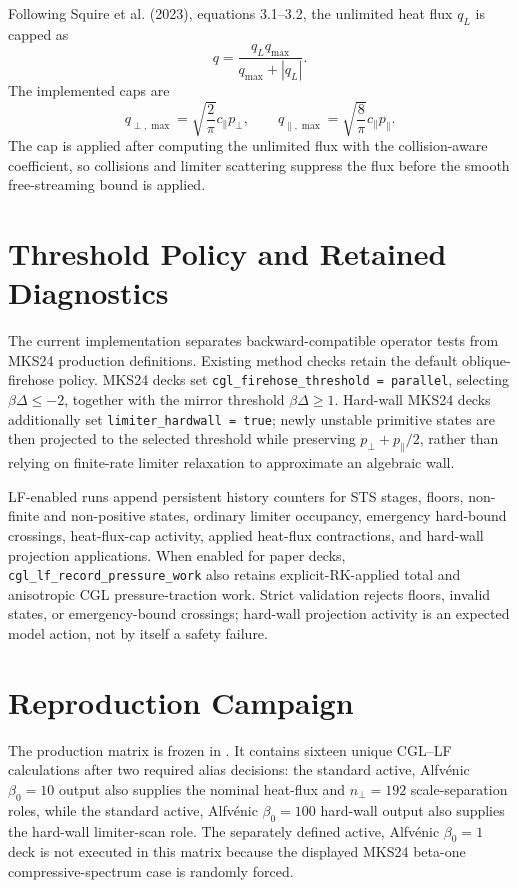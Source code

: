\documentclass[11pt]{article}
\begin{document}
Following Squire et al. (2023), equations 3.1--3.2, the unlimited heat flux
\(q_L\) is capped as
\begin{equation}
  q = \frac{q_L q_{\max}}{q_{\max} + |q_L|}.
\end{equation}
The implemented caps are
\begin{equation}
  q_{\perp,\max} = \sqrt{\frac{2}{\pi}} c_\parallel p_\perp,
  \qquad
  q_{\parallel,\max} = \sqrt{\frac{8}{\pi}} c_\parallel p_\parallel.
\end{equation}
The cap is applied after computing the unlimited flux with the collision-aware
coefficient, so collisions and limiter scattering suppress the flux before the
smooth free-streaming bound is applied.

\section{Threshold Policy and Retained Diagnostics}

The current implementation separates backward-compatible operator tests from
MKS24 production definitions.  Existing method checks retain the default
oblique-firehose policy.  MKS24 decks set
\texttt{cgl\_firehose\_threshold = parallel}, selecting
\(\beta\Delta \leq -2\), together with the mirror threshold
\(\beta\Delta \geq 1\).  Hard-wall MKS24 decks additionally set
\texttt{limiter\_hardwall = true}; newly unstable primitive states are then
projected to the selected threshold while preserving
\(p_\perp + p_\parallel/2\), rather than relying on finite-rate limiter
relaxation to approximate an algebraic wall.

LF-enabled runs append persistent history counters for STS stages, floors,
non-finite and non-positive states, ordinary limiter occupancy, emergency
hard-bound crossings, heat-flux-cap activity, applied heat-flux
contractions, and hard-wall projection applications.  When enabled for
paper decks, \texttt{cgl\_lf\_record\_pressure\_work} also retains
explicit-RK-applied total and anisotropic CGL pressure-traction work.  Strict
validation rejects floors, invalid states, or emergency-bound crossings;
hard-wall projection activity is an expected model action, not by itself a
safety failure.

\section{Reproduction Campaign}

The production matrix is frozen in
.  It contains sixteen
unique CGL--LF calculations after two required alias decisions: the standard
active, Alfv\'enic \(\beta_0=10\) output also supplies the nominal heat-flux
and \(n_\perp=192\) scale-separation roles, while the standard active,
Alfv\'enic \(\beta_0=100\) hard-wall output also supplies the hard-wall
limiter-scan role.  The separately defined active, Alfv\'enic \(\beta_0=1\)
deck is not executed in this matrix because the displayed MKS24 beta-one
compressive-spectrum case is randomly forced.
\end{document}
